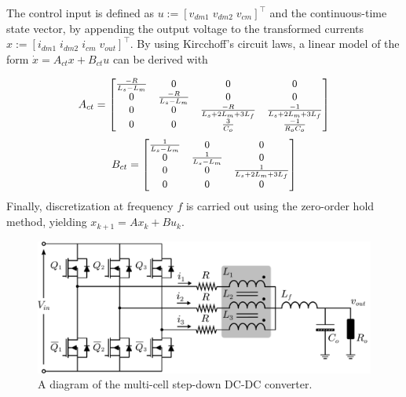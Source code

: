 The control input is defined as $u := [v_{dm1} \; v_{dm2} \; v_{cm}]^\top $ and the continuous-time state vector, by appending the output voltage to the transformed currents $x := [i_{dm1} \; i_{dm2} \; i_{cm} \; v_{out}]^\top $. By using Kircchoff's circuit laws, a linear model of the form $\dot{x} = A_{ct} x + B_{ct} u$ can be derived with

\begin{equation}
	\small
	A_{ct} = 
	\begin{bmatrix}
		\frac{-R}{L_s - L_m} & 0 & 0 & 0 \\
		0 & \frac{-R}{L_s - L_m} & 0 & 0 \\
		0 & 0 & \frac{-R}{L_s + 2L_m + 3L_f} & \frac{-1}{L_s + 2L_m + 3L_f} \\ 
		0 & 0 & \frac{3}{C_o} & \frac{-1}{R_o C_o}
	\end{bmatrix}
\end{equation}
\begin{equation}
	\small
	B_{ct} = 
	\begin{bmatrix}
		\frac{1}{L_s-L_m} & 0 & 0\\
		0 & \frac{1}{L_s-L_m} & 0 \\
		0 & 0 & \frac{1}{L_s + 2L_m + 3L_f} \\ 
		0 & 0 & 0
	\end{bmatrix}
\end{equation}
Finally, discretization at frequency $f$ is carried out using the zero-order hold method, yielding $x_{k+1} = A x_{k} + B u_{k}$.

\begin{figure}[!t]
	\centering
	\includegraphics[width=0.7\linewidth]{../images/chap4_simres_multicelldcdc}
	\caption{A diagram of the multi-cell step-down DC-DC converter.}
	\label{fig.multi-cell}
\end{figure}

